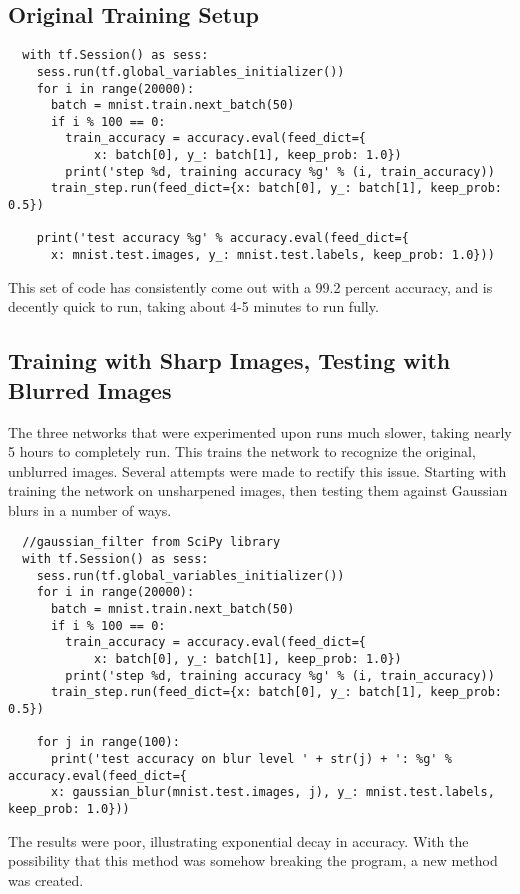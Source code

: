 \documentclass[a4paper]{article}
\begin{document}
\subsection{Original Training Setup}
\begin{lstlisting}
  with tf.Session() as sess:
    sess.run(tf.global_variables_initializer())
    for i in range(20000):
      batch = mnist.train.next_batch(50)
      if i % 100 == 0:
        train_accuracy = accuracy.eval(feed_dict={
            x: batch[0], y_: batch[1], keep_prob: 1.0})
        print('step %d, training accuracy %g' % (i, train_accuracy))
      train_step.run(feed_dict={x: batch[0], y_: batch[1], keep_prob: 0.5})

    print('test accuracy %g' % accuracy.eval(feed_dict={
      x: mnist.test.images, y_: mnist.test.labels, keep_prob: 1.0}))
\end{lstlisting}

This set of code has consistently come out with a 99.2 percent accuracy, and is decently quick to run, taking about 4-5 minutes to run fully.
 

\subsection{Training with Sharp Images, Testing with Blurred Images}
The three networks that were experimented upon runs much slower, taking nearly 5 hours to completely run.
This trains the network to recognize the original, unblurred images. Several attempts were made to rectify this issue. Starting with training the network on unsharpened images, then testing them against Gaussian blurs in a number of ways.

\begin{lstlisting}
  //gaussian_filter from SciPy library
  with tf.Session() as sess:
    sess.run(tf.global_variables_initializer())
    for i in range(20000):
      batch = mnist.train.next_batch(50)
      if i % 100 == 0:
        train_accuracy = accuracy.eval(feed_dict={
            x: batch[0], y_: batch[1], keep_prob: 1.0})
        print('step %d, training accuracy %g' % (i, train_accuracy))
      train_step.run(feed_dict={x: batch[0], y_: batch[1], keep_prob: 0.5})

    for j in range(100):
      print('test accuracy on blur level ' + str(j) + ': %g' % accuracy.eval(feed_dict={
      x: gaussian_blur(mnist.test.images, j), y_: mnist.test.labels, keep_prob: 1.0}))
\end{lstlisting}

The results were poor, illustrating exponential decay in accuracy. With the possibility that this method was somehow breaking the program, a new method was created.
\end{document}
